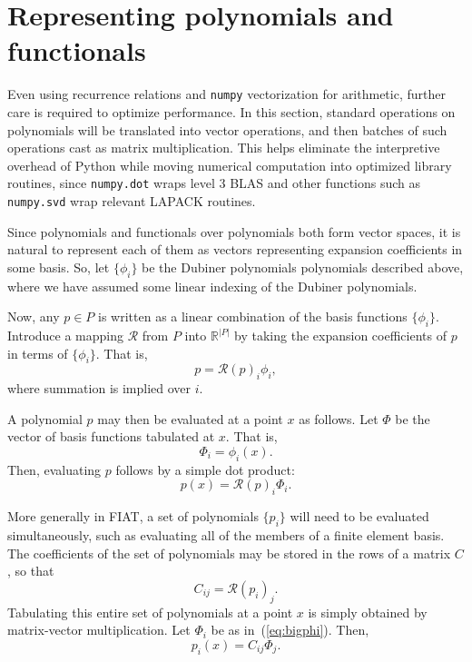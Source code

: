 \section{Representing polynomials and functionals}

Even using recurrence relations and \texttt{numpy} vectorization for
arithmetic, further care is required to optimize performance.  In this
section, standard operations on polynomials will be translated into
vector operations, and then batches of such operations cast as matrix
multiplication.  This helps eliminate the interpretive overhead of Python
while moving numerical computation into optimized library routines,
since \texttt{numpy.dot} wraps level 3 BLAS and other functions such as
\texttt{numpy.svd} wrap relevant LAPACK routines.

Since polynomials and functionals over polynomials both form vector
spaces, it is natural to represent each of them as vectors representing
expansion coefficients in some basis.  So, let \( \{ \phi_i \} \) be the
Dubiner polynomials polynomials described above, where we have assumed
some linear indexing of the Dubiner polynomials.

Now, any \( p \in P \) is written as a linear combination of the basis
functions \( \{ \phi_i \} \).  Introduce a mapping \( \mathcal{R} \) from
\( P \) into \( \mathbb{R}^{|P|} \) by taking the expansion coefficients
of \( p \) in terms of \( \{ \phi_i \} \).  That is,
\[
p = \mathcal{R}(p)_i \phi_i,
\]
where summation is implied over \( i \).

A polynomial \( p \) may then be evaluated at a point \( x \) as follows.
Let \( \Phi \) be the vector of basis functions tabulated at \( x \).
That is,
\begin{equation}
\label{eq:bigphi}
\Phi_i = \phi_i(x).
\end{equation}
Then, evaluating \( p \) follows by a simple dot product:
\begin{equation}
\label{eq:doteval}
p(x) = \mathcal{R}(p)_i \Phi_i.
\end{equation}

More generally in FIAT, a set of polynomials \( \{ p_i \} \) will need
to be evaluated simultaneously, such as evaluating all of the members
of a finite element basis.  The coefficients of the set of polynomials
may be stored in the rows of a matrix \( C \), so that
\[
C_{ij} = \mathcal{R}(p_i)_j.
\]
Tabulating this entire set of polynomials at a point \( x \) is simply
obtained by matrix-vector multiplication.  Let \( \Phi_i \) be as
in~(\ref{eq:bigphi}).  Then,
\[
p_i(x) = C_{ij} \Phi_j.
\]

